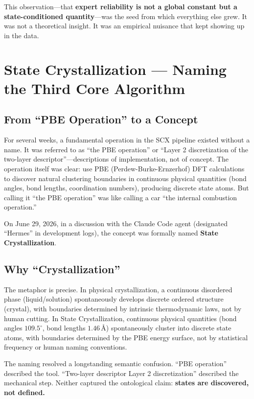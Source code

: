 \documentclass[12pt,a4paper]{ctexart}
\begin{document}
This observation—that \textbf{expert reliability is not a global constant but a state-conditioned quantity}—was the seed from which everything else grew. It was not a theoretical insight. It was an empirical nuisance that kept showing up in the data.

\section{State Crystallization — Naming the Third Core Algorithm}

\subsection{From ``PBE Operation'' to a Concept}

For several weeks, a fundamental operation in the SCX pipeline existed without a name. It was referred to as ``the PBE operation'' or ``Layer 2 discretization of the two-layer descriptor''—descriptions of implementation, not of concept. The operation itself was clear: use PBE (Perdew-Burke-Ernzerhof) DFT calculations to discover natural clustering boundaries in continuous physical quantities (bond angles, bond lengths, coordination numbers), producing discrete state atoms. But calling it ``the PBE operation'' was like calling a car ``the internal combustion operation.''

On June 29, 2026, in a discussion with the Claude Code agent (designated ``Hermes'' in development logs), the concept was formally named \textbf{State Crystallization}.

\subsection{Why ``Crystallization''}

The metaphor is precise. In physical crystallization, a continuous disordered phase (liquid/solution) spontaneously develops discrete ordered structure (crystal), with boundaries determined by intrinsic thermodynamic laws, not by human cutting. In State Crystallization, continuous physical quantities (bond angles $109.5^\circ$, bond lengths $1.46$\,\AA) spontaneously cluster into discrete state atoms, with boundaries determined by the PBE energy surface, not by statistical frequency or human naming conventions.

The naming resolved a longstanding semantic confusion. ``PBE operation'' described the tool. ``Two-layer descriptor Layer 2 discretization'' described the mechanical step. Neither captured the ontological claim: \textbf{states are discovered, not defined.}
\end{document}
